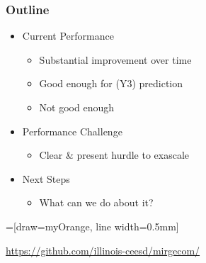\begin{frame}\frametitle{Outline}
\begin{minipage}[T]{0.45\textwidth}
  \begin{itemize}
    \setlength{\itemsep}{0.2in}
    \item Current \ceesdcode{} Performance
    \begin{itemize}
    \item Substantial improvement over time
    \item Good enough for (Y3) prediction
    \item Not good enough
    \end{itemize}
    \item Performance Challenge
    \begin{itemize}
    \item Clear \& present hurdle to exascale
    \end{itemize}
    \item Next Steps
    \begin{itemize}
    \item What can we do about it?
    \end{itemize}
  \end{itemize}
\end{minipage}
\hfill
\begin{minipage}[T]{0.45\textwidth}
  \centering
  =[draw=myOrange, line width=0.5mm]
  \softwaredeps%
\end{minipage}
  \url{https://github.com/illinois-ceesd/mirgecom/}
\end{frame}






